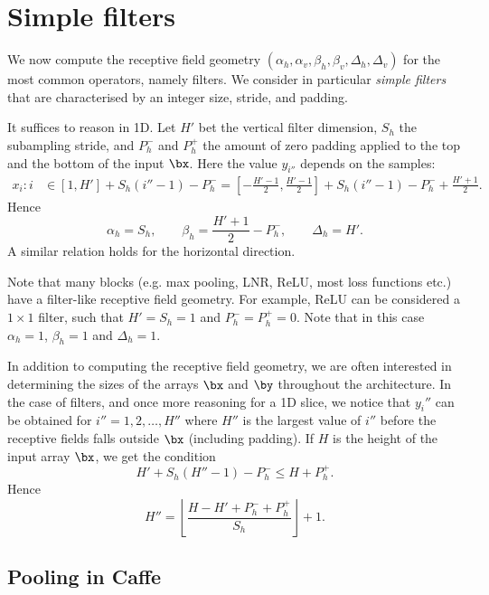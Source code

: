 \section{Simple filters}\label{s:receptive-simple-filters}

We now compute the receptive field geometry $(\alpha_h,\alpha_v,\beta_h,\beta_v,\Delta_h,\Delta_v)$ for the most common operators, namely filters. We consider in particular \emph{simple filters} that are characterised by an integer size, stride, and padding.

It suffices to reason in 1D.  Let $H'$ bet the vertical filter dimension, $S_h$ the subampling stride, and $P_h^-$ and $P_h^+$ the amount of zero padding applied to the top and the bottom of the input $\bx$. Here the value $y_{i''}$ depends on the samples:
\begin{align*}
 x_i : i
 &\in
 [1, H'] + S_h (i'' - 1) - P_h^-
=
\left[-\frac{H'-1}{2}, \frac{H'-1}{2}\right] + S_h (i''-1) - P_h^- + \frac{H'+1}{2}.
\end{align*}
Hence
\[
\alpha_h = S_h,
\qquad
\beta _h = \frac{H'+1}{2} - P_h^-,
\qquad
\Delta_h = H'.
\]
A similar relation holds for the horizontal direction.

Note that many blocks (e.g. max pooling, LNR, ReLU, most loss functions etc.) have a filter-like receptive field geometry. For example, ReLU can be considered a $1 \times 1$ filter, such that $H'=S_h=1$ and $P_h^-=P_h^+ =0$. Note that in this case $\alpha_h=1$, $\beta_h=1$ and $\Delta_h=1$.

In addition to computing the receptive field geometry, we are often interested in determining the sizes of the arrays $\bx$ and $\by$ throughout the architecture. In the case of filters, and once more reasoning for a 1D slice, we notice that $y_i''$ can be obtained for $i''=1,2,\dots,H''$ where $H''$ is the largest value of $i''$ before the receptive fields falls outside $\bx$ (including padding). If $H$ is the height of the input array $\bx$, we get the condition
\[
   H' + S_h (H'' - 1) - P_h^- \leq H + P_h^+.
\]
Hence
\begin{equation}\label{e:filtered-height}
   H'' = \left\lfloor \frac{H - H' + P_h^- + P_h^+}{S_h} \right\rfloor + 1.	
\end{equation}

\subsection{Pooling in Caffe}

